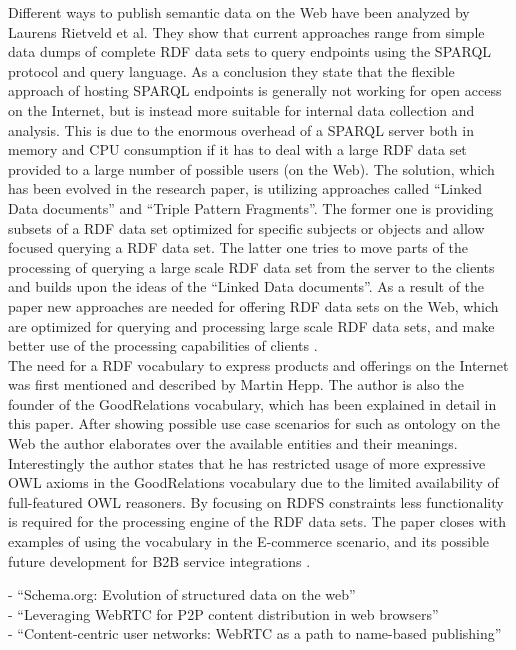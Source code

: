 Different ways to publish semantic data on the Web have been analyzed by Laurens Rietveld et al. They show that current approaches range from simple data dumps of complete \gls{RDF} data sets to query endpoints using the \gls{SPARQL} protocol and query language. As a conclusion they state that the flexible approach of hosting \gls{SPARQL} endpoints is generally not working for open access on the Internet, but is instead more suitable for internal data collection and analysis. This is due to the enormous overhead of a \gls{SPARQL} server both in memory and CPU consumption if it has to deal with a large \gls{RDF} data set provided to a large number of possible users (on the Web). The solution, which has been evolved in the research paper, is utilizing approaches called ``Linked Data documents'' and ``Triple Pattern Fragments''. The former one is providing subsets of a \gls{RDF} data set optimized for specific subjects or objects and allow focused querying a \gls{RDF} data set. The latter one tries to move parts of the processing of querying a large scale \gls{RDF} data set from the server to the clients and builds upon the ideas of the ``Linked Data documents''. As a result of the paper new approaches are needed for offering \gls{RDF} data sets on the Web, which are optimized for querying and processing large scale \gls{RDF} data sets, and make better use of the processing capabilities of clients \citep{rietveld2015linked}. \\

The need for a \gls{RDF} vocabulary to express products and offerings on the Internet was first mentioned and described by Martin Hepp. The author is also the founder of the GoodRelations vocabulary, which has been explained in detail in this paper. After showing possible use case scenarios for such as ontology on the Web the author elaborates over the available entities and their meanings. Interestingly the author states that he has restricted usage of more expressive \gls{OWL} axioms in the GoodRelations vocabulary due to the limited availability of full-featured \gls{OWL} reasoners. By focusing on \gls{RDFS} constraints less functionality is required for the processing engine of the \gls{RDF} data sets. The paper closes with examples of using the vocabulary in the \gls{E-commerce} scenario, and its possible future development for \gls{B2B} service integrations \citep{hepp2008goodrelations}.

- ``Schema.org: Evolution of structured data on the web'' \citep{guha2016schema} \\
- ``Leveraging WebRTC for P2P content distribution in web browsers'' \citep{vogt2013leveraging} \\
- ``Content-centric user networks: WebRTC as a path to name-based publishing'' \citep{vogt2013content}

